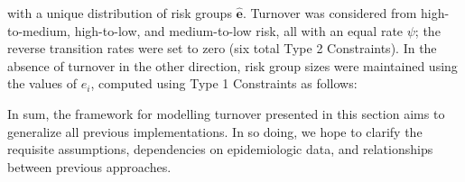 with a unique distribution of risk groups $\bm{\hat{e}}$.
Turnover was considered from
high-to-medium, high-to-low, and medium-to-low risk,
all with an equal rate $\psi$;
the reverse transition rates were set to zero
(six total Type 2 Constraints).
In the absence of turnover in the other direction,
risk group sizes were maintained using the values of $\hat{e}_i$,
computed using Type 1 Constraints as follows:

\par
In sum, the framework for modelling turnover presented in this section
aims to generalize all previous implementations.
In so doing, we hope to clarify the requisite assumptions,
dependencies on epidemiologic data,
and relationships between previous approaches.
